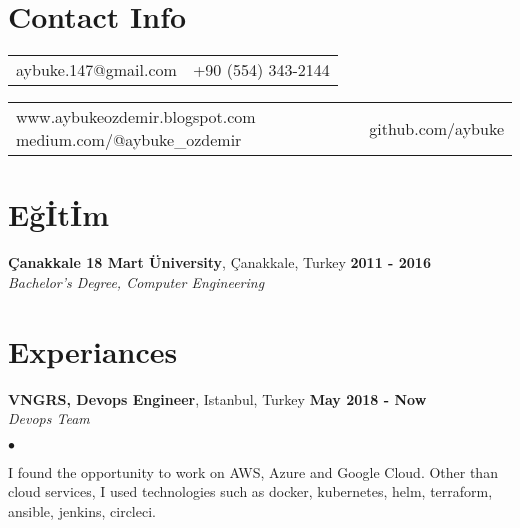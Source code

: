 \documentclass[margin,line]{res}
\newenvironment{list2}{
  \begin{list}{$\bullet$}{%
      \setlength{\itemsep}{0in}
      \setlength{\parsep}{0in} \setlength{\parskip}{0in}
      \setlength{\topsep}{0in} \setlength{\partopsep}{0in}
      \setlength{\leftmargin}{0.1in}}}{\end{list}}
\begin{document}
\small
{}

\begin{resume}
\section{\sc Contact Info}
\begin{tabular}{@{}p{2in}p{3.8in}}
aybuke.147@gmail.com & {\hfill{\it}  +90 (554) 343-2144} \\
\end{tabular}
\begin{tabular}{@{}p{2in}p{3.8in}}
www.aybukeozdemir.blogspot.com medium.com/@aybuke\_ozdemir& {\hfill{\it}  github.com/aybuke} \\
\end{tabular}

\vspace*{-.3cm}
\section{\sc E\u{g}\.{I}t\.{I}m}

{\bf \c{C}anakkale 18 Mart \"{U}niversity}, \c{C}anakkale, Turkey  \hfill {\bf 2011 - 2016} \\

\vspace*{-.7cm}
{\em Bachelor's Degree, Computer Engineering} \hfill {\ } \\
\vspace*{-.09in}
\vspace*{-.3cm}


\vspace*{-.3cm}
\section{\sc Experiances}

{\bf VNGRS, Devops Engineer}, Istanbul, Turkey \hfill {\bf May 2018 - Now}\\

\vspace{-.7cm}
{\em Devops Team }
\vspace*{+.05in}
\begin{list2}
\item I found the opportunity to work on AWS, Azure and Google Cloud. Other than cloud services, I used technologies such as docker, kubernetes, helm, terraform, ansible, jenkins, circleci.
\end{list2}


\end{resume}
\end{document}
